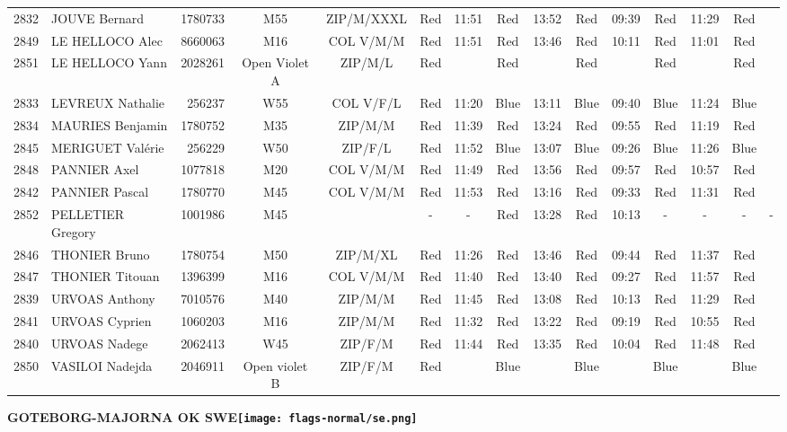 \documentclass{report}
\begin{document}
\begin{longtable}{|c|l|r|c|c|*{5}{cc|}}
    2832 & JOUVE Bernard & 1780733 & M55 & ZIP/M/XXXL & Red & 11:51 & Red & 13:52 & Red & 09:39 & Red & 11:29 & Red &  \\
    2849 & LE HELLOCO Alec & 8660063 & M16 & COL V/M/M & Red & 11:51 & Red & 13:46 & Red & 10:11 & Red & 11:01 & Red &  \\
    2851 & LE HELLOCO Yann & 2028261 & Open Violet A & ZIP/M/L & Red &   & Red &   & Red &   & Red &   & Red &  \\
    2833 & LEVREUX Nathalie & 256237 & W55 & COL V/F/L & Red & 11:20 & Blue & 13:11 & Blue & 09:40 & Blue & 11:24 & Blue &  \\
    2834 & MAURIES Benjamin & 1780752 & M35 & ZIP/M/M & Red & 11:39 & Red & 13:24 & Red & 09:55 & Red & 11:19 & Red &  \\
    2845 & MERIGUET Valérie & 256229 & W50 & ZIP/F/L & Red & 11:52 & Blue & 13:07 & Blue & 09:26 & Blue & 11:26 & Blue &  \\
    2848 & PANNIER Axel & 1077818 & M20 & COL V/M/M & Red & 11:49 & Red & 13:56 & Red & 09:57 & Red & 10:57 & Red &  \\
    2842 & PANNIER Pascal & 1780770 & M45 & COL V/M/M & Red & 11:53 & Red & 13:16 & Red & 09:33 & Red & 11:31 & Red &  \\
    2852 & PELLETIER Gregory & 1001986 & M45 &   & - &  - & Red & 13:28 & Red & 10:13 & - &  - & - &  -\\
    2846 & THONIER Bruno & 1780754 & M50 & ZIP/M/XL & Red & 11:26 & Red & 13:46 & Red & 09:44 & Red & 11:37 & Red &  \\
    2847 & THONIER Titouan & 1396399 & M16 & COL V/M/M & Red & 11:40 & Red & 13:40 & Red & 09:27 & Red & 11:57 & Red &  \\
    2839 & URVOAS Anthony & 7010576 & M40 & ZIP/M/M & Red & 11:45 & Red & 13:08 & Red & 10:13 & Red & 11:29 & Red &  \\
    2841 & URVOAS Cyprien & 1060203 & M16 & ZIP/M/M & Red & 11:32 & Red & 13:22 & Red & 09:19 & Red & 10:55 & Red &  \\
    2840 & URVOAS Nadege & 2062413 & W45 & ZIP/F/M & Red & 11:44 & Red & 13:35 & Red & 10:04 & Red & 11:48 & Red &  \\
    2850 & VASILOI Nadejda & 2046911 & Open violet B & ZIP/F/M & Red &   & Blue &   & Blue &   & Blue &   & Blue &  \\
  \end{longtable}
\newpage
  \Huge \centering \bfseries GOTEBORG-MAJORNA OK  SWE\normalfont \footnotesize \sffamily \hfill \texttt{[image: flags-normal/se.png]} \newline 
\end{document}
